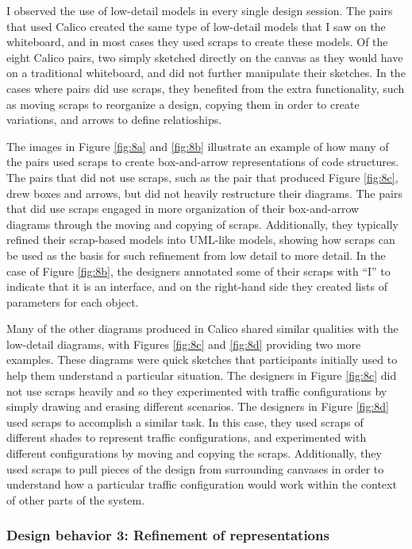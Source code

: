 I observed the use of low-detail models in every single design session. The pairs that used Calico created the same type of low-detail models that I saw on the whiteboard, and in most cases they used scraps to create these models. Of the eight Calico pairs, two simply sketched directly on the canvas as they would have on a traditional whiteboard, and did not further manipulate their sketches. In the cases where pairs did use scraps, they benefited from the extra functionality, such as moving scraps to reorganize a design, copying them in order to create variations, and arrows to define relatioships.

The images in Figure \ref{fig:8a} and \ref{fig:8b} illustrate an example of how many of the pairs used scraps to create box-and-arrow representations of code structures. The pairs that did not use scraps, such as the pair that produced Figure \ref{fig:8c}, drew boxes and arrows, but did not heavily restructure their diagrams. The pairs that did use scraps engaged in more organization of their box-and-arrow diagrams through the moving and copying of scraps. Additionally, they typically refined their scrap-based models into UML-like models, showing how scraps can be used as the basis for such refinement from low detail to more detail. In the case of Figure \ref{fig:8b}, the designers annotated some of their scraps with ``I'' to indicate that it is an interface, and on the right-hand side they created lists of parameters for each object.

Many of the other diagrams produced in Calico shared similar qualities with the low-detail diagrams, with Figures \ref{fig:8c} and \ref{fig:8d} providing two more examples. These diagrams were quick sketches that participants initially used to help them understand a particular situation. The designers in Figure \ref{fig:8c} did not use scraps heavily and so they experimented with traffic configurations by simply drawing and erasing different scenarios. The designers in Figure \ref{fig:8d} used scraps to accomplish a similar task. In this case, they used scraps of different shades to represent traffic configurations, and experimented with different configurations by moving and copying the scraps. Additionally, they used scraps to pull pieces of the design from surrounding canvases in order to understand how a particular traffic configuration would work within the context of other parts of the system. 



\subsubsection {Design behavior 3: Refinement of representations}
\label{results:24}

